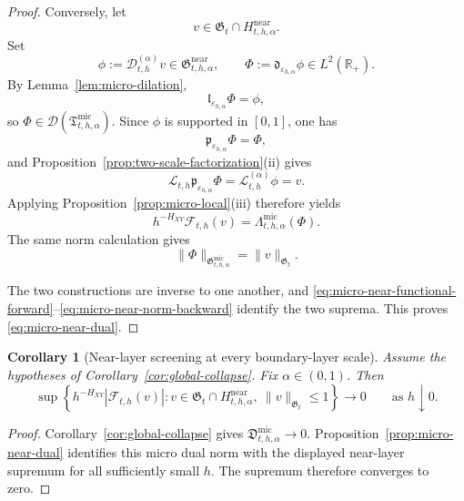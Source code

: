 \documentclass[11pt,a4paper]{amsart}
\theoremstyle{plain}
\newtheorem{corollary}[theorem]{Corollary}
\theoremstyle{definition}
\theoremstyle{remark}
\newcommand{\R}{\mathbb{R}}
\begin{document}
\begin{proof}
Conversely, let
\[
v\in\mathfrak G_t\cap H_{t,h,\alpha}^{\mathrm{near}}.
\]
Set
\[
\phi:=\mathcal D_{t,h}^{(\alpha)}v\in \mathfrak G_{t,h,\alpha}^{\mathrm{near}},
\qquad
\Phi:=\mathfrak d_{\varepsilon_{h,\alpha}}\phi\in L^2(\R_+).
\]
By Lemma~\ref{lem:micro-dilation},
\[
\mathfrak l_{\varepsilon_{h,\alpha}}\Phi=\phi,
\]
so \(\Phi\in\mathcal D(\mathfrak T_{t,h,\alpha}^{\mathrm{mic}})\). Since \(\phi\) is supported in
\([0,1]\), one has
\[
\mathfrak p_{\varepsilon_{h,\alpha}}\Phi=\Phi,
\]
and Proposition~\ref{prop:two-scale-factorization}(ii) gives
\[
\mathcal L_{t,h}\mathfrak p_{\varepsilon_{h,\alpha}}\Phi
=
\mathcal L_{t,h}^{(\alpha)}\phi
=
v.
\]
Applying Proposition~\ref{prop:micro-local}(iii) therefore yields
\begin{equation}\label{eq:micro-near-functional-backward}
h^{-H_{XY}}\mathcal F_{t,h}(v)=\Lambda_{t,h,\alpha}^{\mathrm{mic}}(\Phi).
\end{equation}
The same norm calculation gives
\begin{equation}\label{eq:micro-near-norm-backward}
\|\Phi\|_{\mathfrak G_{t,h,\alpha}^{\mathrm{mic}}}
=
\|v\|_{\mathfrak G_t}.
\end{equation}

The two constructions are inverse to one another, and
\eqref{eq:micro-near-functional-forward}--\eqref{eq:micro-near-norm-backward} identify the two
suprema. This proves \eqref{eq:micro-near-dual}.
\end{proof}

\begin{corollary}[Near-layer screening at every boundary-layer scale]
\label{cor:micro-near-screening}
Assume the hypotheses of Corollary~\ref{cor:global-collapse}. Fix \(\alpha\in(0,1)\). Then
\begin{equation}\label{eq:near-screening}
\sup\left\{
h^{-H_{XY}}\left|\mathcal F_{t,h}(v)\right|:
v\in\mathfrak G_t\cap H_{t,h,\alpha}^{\mathrm{near}},
\ \|v\|_{\mathfrak G_t}\le1
\right\}
\longrightarrow0
\qquad\text{as }h\downarrow0.
\end{equation}
\end{corollary}

\begin{proof}
Corollary~\ref{cor:global-collapse} gives
\(\mathfrak D_{t,h,\alpha}^{\mathrm{mic}}\to0\). Proposition~\ref{prop:micro-near-dual}
identifies this micro dual norm with the displayed near-layer supremum for all sufficiently small
\(h\). The supremum therefore converges to zero.
\end{proof}
\end{document}
